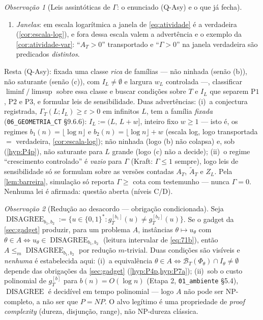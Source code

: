 \documentclass[11pt,a4paper]{article}
\theoremstyle{definition}
\theoremstyle{remark}
\newtheorem*{remark}{Observação}
\begin{document}
\begin{remark}[Leis assintóticas de $\Gamma$: o enunciado (Q-Asy) e o que já fecha]
\begin{enumerate}
  $\Gamma_T(L;I) > 0 \iff \mathcal{C}_T(L) \cap I \neq \emptyset$
  (sentido $\Rightarrow$: soma de termos $\geq 0$ positiva $\Rightarrow$
  algum indicador $1$; $\Leftarrow$: um $r \in \mathcal{C}_T(L) \cap I$
  pertence a alguma $\mathcal{B}_T(\Phi)$ com $|\Phi| \leq L$);
\item[(e)] \emph{Janelas}: em escala logarítmica a janela de
  \eqref{eq:atividade} é a verdadeira (\cref{cor:escala-log}), e fora
  dessa escala valem a advertência e o exemplo da
  \cref{cor:atividade-var}: ``$A_T > 0$'' transportado e ``$\Gamma >
  0$'' na janela verdadeira são predicados \emph{distintos}.
\end{enumerate}
Resta (Q-Asy): fixada uma classe \emph{rica} de famílias ---
não ninhada (senão (b)), não saturante (senão (c)), com $I_L \neq
\emptyset$ e largura $w_L$ controlada ---, classificar
$\liminf/\limsup$ sobre essa classe e buscar condições sobre $T$ e
$I_L$ que separem $\mathrm{P1}$, $\mathrm{P2}$ e $\mathrm{P3}$, e
formular leis de sensibilidade. Duas advertências: (i)~a conjectura
registrada, $\Gamma_T(L;I_L) \geq \varepsilon > 0$ em infinitos $L$,
tem a família \emph{fixada} (\texttt{06\_GEOMETRIA\_CT} §9.6.6):
$I_L := (L,\,L+w]$, inteiro fixo $w \geq 1$ --- isto é, os regimes
$b_1(n) = \lfloor\log n\rfloor$ e $b_2(n) = \lfloor\log n\rfloor + w$
(escala log, logo transportada $=$ verdadeira,
\cref{cor:escala-log}); não ninhada (logo (b) não colapsa) e, sob
(\ref{hyp:P4p}), não saturante para $L$ grande (logo (c) não a
decide);
(ii)~o regime ``crescimento controlado'' é \emph{vazio} para
$\Gamma$ (Kraft: $\Gamma \leq 1$ sempre), logo leis de sensibilidade
só se formulam sobre as versões contadas $A_T$, $\widetilde{A}_T$ e
$Z_L$. Pela \cref{lem:barreira}, simulação só reporta $\Gamma \geq$
cota com testemunho --- nunca $\Gamma = 0$. Nenhuma lei é afirmada:
questão aberta (níveis C/D).
\end{remark}

\begin{remark}[Redução ao desacordo --- obrigação condicionada]\label{rem:disagree}
Seja $\operatorname{DISAGREE}_{b_1,b_2} := \{u \in \{0,1\}^* :
g_T^{[b_1]}(u) \neq g_T^{[b_2]}(u)\}$. Se o gadget da
\cref{sec:gadget} produzir, para um problema $A$, instâncias
$\theta \mapsto u_\theta$ com $\theta \in A \iff u_\theta \in
\operatorname{DISAGREE}_{b_1,b_2}$ (leitura intervalar de
\eqref{eq:71b}), então $A \leq_m \operatorname{DISAGREE}_{b_1,b_2}$
por redução $m$-trivial. Duas condições são visíveis e \emph{nenhuma}
é estabelecida aqui: (i)~a equivalência
$\theta \in A \iff \mathcal{B}_T(\Phi_\theta) \cap I_\theta \neq
\emptyset$ depende das obrigações da \cref{sec:gadget}
(\cref{hyp:P4p,hyp:P7a}); (ii)~sob o custo polinomial de
$g_T^{[b]}$ para $b(n) = O(\log n)$ (Etapa 2,
\texttt{01\_ambiente} §5.4), $\operatorname{DISAGREE}$ é decidível em
tempo polinomial --- logo $A$ não pode ser NP-completo, a não ser que
$P = NP$. O alvo legítimo é uma propriedade de \emph{proof
complexity} (dureza, disjunção, range), não NP-dureza clássica.
\end{remark}
\end{document}
